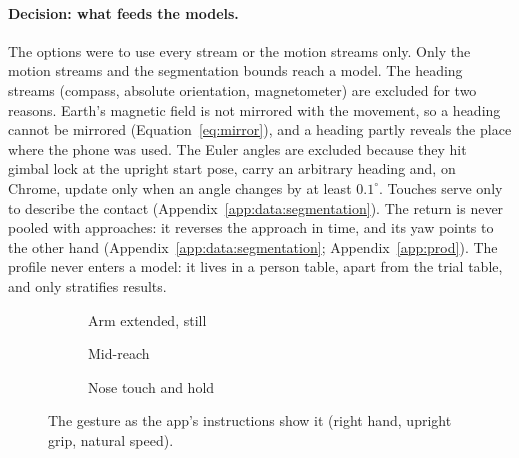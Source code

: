 \paragraph{Decision: what feeds the models.} The options were to use every stream or the motion streams only.
Only the motion streams and the segmentation bounds reach a model. The heading streams (compass, absolute
orientation, magnetometer) are excluded for two reasons. Earth's magnetic field is not mirrored with the
movement, so a heading cannot be mirrored (Equation~\eqref{eq:mirror}), and a heading partly reveals the place
where the phone was used. The Euler angles are excluded because they hit gimbal lock at the upright start pose,
carry an arbitrary heading and, on Chrome, update only when an angle changes by at least $0.1^\circ$. Touches
serve only to describe the contact (Appendix~\ref{app:data:segmentation}). The return is never pooled with
approaches: it reverses the approach in time, and its yaw points to the other hand
(Appendix~\ref{app:data:segmentation}; Appendix~\ref{app:prod}). The profile never enters a model:
it lives in a person table, apart from the trial table, and only stratifies results.

\begin{figure}[htbp]
\centering
\begin{subfigure}[t]{0.32\linewidth}\centering
  \caption{Arm extended, still}
\end{subfigure}\hfill
\begin{subfigure}[t]{0.32\linewidth}\centering
  \caption{Mid-reach}
\end{subfigure}\hfill
\begin{subfigure}[t]{0.32\linewidth}\centering
  \caption{Nose touch and hold}
\end{subfigure}
\caption{The gesture as the app's instructions show it (right hand, upright grip, natural speed).}
\label{fig:gesture}
\end{figure}

